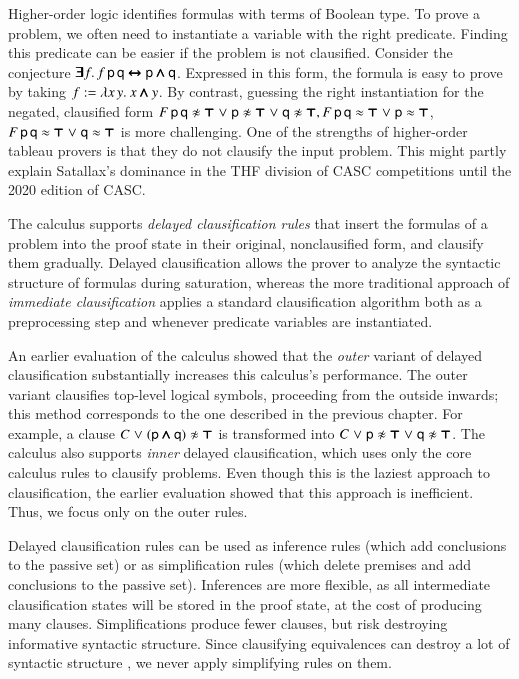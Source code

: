 Higher-order logic identifies formulas with terms of Boolean type. To prove a problem, we often
need to instantiate a variable with the right predicate.
Finding this predicate can be easier if the problem is not clausified.
Consider the conjecture $\pmb{\exists} f. \, f \, \mathsf{p} \, \mathsf{q} \pmb{\leftrightarrow} \mathsf{p}
\pmb{\land} \mathsf{q}$. Expressed in this form, the formula is easy to prove by taking
$f := \lambda x \, y. \> x  \pmb{\land} y$. By contrast, guessing the right
instantiation for the negated, clausified form $ \neglit{F \, \cst{p} \,
\cst{q}} \llor \neglit{\cst{p}} \llor \neglit{\cst{q}},
\poslit{F \, \cst{p} \, \cst{q}} \llor \poslit{\cst{p}}$, $F \, \mathsf{p}
\, \mathsf{q} \approx \pmb{\top} \mathrel\lor \mathsf{q} \approx \pmb{\top}$ is more challenging.
One of the strengths of higher-order tableau provers is that they do not clausify the input
problem. This might partly explain Satallax's dominance in the THF division of CASC
competitions until the 2020 edition of CASC.

The \osup{} calculus supports \emph{delayed clausification rules} that insert
the formulas of a problem into the proof state in their original, nonclausified form, and
clausify them gradually. Delayed clausification allows the prover to analyze the
syntactic structure of formulas during saturation, whereas the more traditional
approach of \emph{immediate clausification} applies a standard clausification
algorithm \cite{nw-01-small-cnf} both as a preprocessing step and whenever
predicate variables are instantiated.

An earlier evaluation of the \osup{} calculus \cite{bbtv-21-full-ho-sup} showed
that the \emph{outer} variant of delayed clausification substantially increases
this calculus's performance. The outer variant clausifies top-level logical
symbols, proceeding from the outside inwards; this method corresponds to the one
described in the previous chapter. For example, a clause $C \llor
\neglit{(\cst{p} \iand \cst{q})}$ is transformed into $C \llor \neglit{\cst p}
\llor \neglit{\cst q}$. The calculus also supports \emph{inner} delayed
clausification, which uses only the core calculus rules to clausify problems.
Even though this is the laziest approach to clausification, the earlier
evaluation \cite{bbtv-21-full-ho-sup} showed that this
approach is inefficient. Thus, we focus only on the outer rules.

Delayed clausification rules can be used as inference rules (which add conclusions
to the passive set) or as simplification rules (which delete premises and add
conclusions to the passive set).
%
Inferences are more flexible, as all
intermediate clausification states will be stored in the proof state, at the
cost of producing many clauses. Simplifications produce fewer clauses,
but risk destroying informative syntactic structure.
Since clausifying equivalences can destroy a lot of syntactic structure
\cite{gs-05-boolsup}, we never apply simplifying rules
on them.

